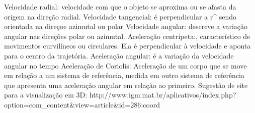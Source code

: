 \documentclass[a4paper,12pt]{article}
\begin{document}
	Velocidade radial: velocidade com que o objeto se aproxima ou se afasta da origem na direção radial.
Velocidade tangencial: é perpendicular a r^ sendo orientada na direçoe azimutal ou polar
Velocidade angular: descreve a variação angular nas direções polar ou azimutal.
Aceleração centripeta:, característico de movimentos curvilíneos ou circulares. Ela é perpendicular à velocidade e aponta para o centro da trajetória.
Aceleração angular: é a variação da velocidade angular no tempo
Aceleração de Coriolis: Aceleração de um corpo que se move em relação a um sistema de referência, medida em outro sistema de referência que apresenta uma aceleração angular em relação ao primeiro.
Sugestão de site para a visualização em 3D: http://www.igm.mat.br/aplicativos/index.php?option=com_content&view=article&id=286:coord
	\[  \]
	 
\end{document}
